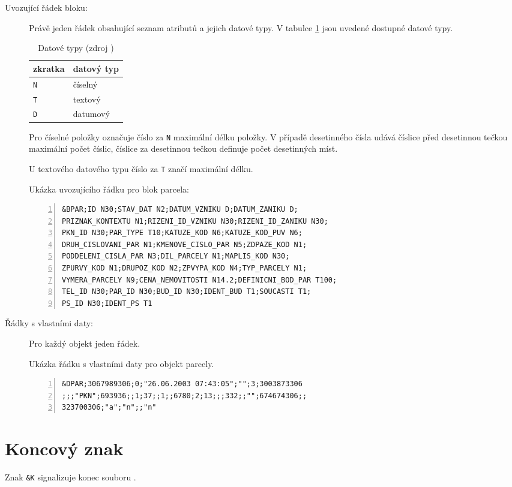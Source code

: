 \begin{description}	
	\item[Uvozující řádek bloku:] Právě jeden řádek obsahující seznam atributů a jejich datové typy. V tabulce \ref{tab:datove_typy} jsou uvedené dostupné datové typy.

		\begin{table}[H]
		\begin{tabular}{|l|l|}
		\hline
		 zkratka & datový typ \\
		\hline
		\hline
		 \texttt{N} & číselný \\ \hline
		 \texttt{T} & textový \\ \hline
		 \texttt{D} & datumový \\
		 \hline
		\end{tabular}
		 \centering
		  \caption{Datové typy (zdroj \citep{struktura_vfk})}
		  \label{tab:datove_typy}
		\end{table}

Pro číselné položky označuje číslo za \texttt{N} maximální délku položky. V případě desetinného čísla udává číslice před desetinnou tečkou maximální počet číslic, číslice za desetinnou tečkou definuje počet desetinných míst.

U textového datového typu číslo za \texttt{T} značí maximální délku.

Ukázka uvozujícího řádku pro blok parcela:

	\begin{lstlisting}[basicstyle=\footnotesize\ttfamily, backgroundcolor = \color{light-gray},  numbers=left]
&BPAR;ID N30;STAV_DAT N2;DATUM_VZNIKU D;DATUM_ZANIKU D;
PRIZNAK_KONTEXTU N1;RIZENI_ID_VZNIKU N30;RIZENI_ID_ZANIKU N30;
PKN_ID N30;PAR_TYPE T10;KATUZE_KOD N6;KATUZE_KOD_PUV N6;
DRUH_CISLOVANI_PAR N1;KMENOVE_CISLO_PAR N5;ZDPAZE_KOD N1;
PODDELENI_CISLA_PAR N3;DIL_PARCELY N1;MAPLIS_KOD N30;
ZPURVY_KOD N1;DRUPOZ_KOD N2;ZPVYPA_KOD N4;TYP_PARCELY N1;
VYMERA_PARCELY N9;CENA_NEMOVITOSTI N14.2;DEFINICNI_BOD_PAR T100;
TEL_ID N30;PAR_ID N30;BUD_ID N30;IDENT_BUD T1;SOUCASTI T1;
PS_ID N30;IDENT_PS T1
	\end{lstlisting}

	\item[Řádky s vlastními daty:] Pro každý objekt jeden řádek.

Ukázka řádku s vlastními daty pro objekt parcely.
	
	\begin{lstlisting}[basicstyle=\footnotesize\ttfamily, backgroundcolor = \color{light-gray},  numbers=left]
&DPAR;3067989306;0;"26.06.2003 07:43:05";"";3;3003873306
;;;"PKN";693936;;1;37;;1;;6780;2;13;;;332;;"";674674306;;
323700306;"a";"n";;"n"
	\end{lstlisting}
\end{description}

\section{Koncový znak}
\label{koncovy_znak}

Znak \texttt{\&K} signalizuje konec souboru .

